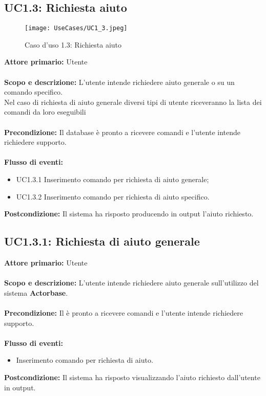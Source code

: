 \documentclass{scalatekids-article}
\begin{document}
\subsection{UC1.3: Richiesta aiuto}
\begin{figure}[H]
  \begin{center}
    \texttt{[image: UseCases/UC1\_3.jpeg]}
    \caption{Caso d'uso 1.3: Richiesta aiuto}
  \end{center}
\end{figure}
\textbf{Attore primario:} Utente\\ \\
\textbf{Scopo e descrizione:} L'utente intende richiedere aiuto generale o su un comando specifico.\\Nel caso di richiesta di aiuto generale diversi tipi di utente riceveranno la lista dei comandi da loro eseguibili\\ \\
\textbf{Precondizione:} Il database è pronto a ricevere comandi e l'utente intende richiedere supporto.\\ \\
\textbf{Flusso di eventi:}
\begin{itemize}
\item UC1.3.1 Inserimento comando per richiesta di aiuto generale;
\item UC1.3.2 Inserimento comando per richiesta di aiuto specifico.
\end{itemize}
\textbf{Postcondizione:} Il sistema ha risposto producendo in output l'aiuto richiesto.
\subsection{UC1.3.1: Richiesta di aiuto generale}
\textbf{Attore primario:} Utente\\ \\
\textbf{Scopo e descrizione:} L'utente intende richiedere aiuto generale sull'utilizzo del sistema \textbf{Actorbase}.\\ \\
\textbf{Precondizione:} Il  è pronto a ricevere comandi e l'utente intende richiedere supporto.\\ \\
\textbf{Flusso di eventi:}
\begin{itemize}
\item Inserimento comando per richiesta di aiuto.
\end{itemize}
\textbf{Postcondizione:} Il sistema ha risposto visualizzando l'aiuto richiesto dall'utente in output.
\end{document}
